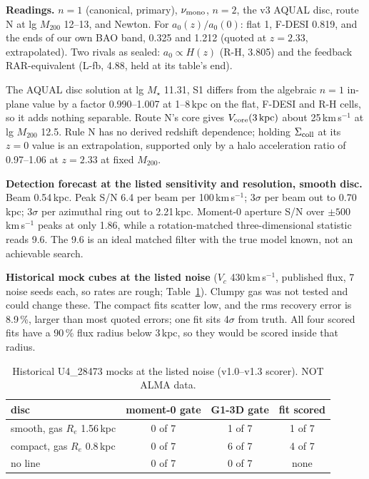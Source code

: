\documentclass[10pt]{article}
\begin{document}
\textbf{Readings.} $n=1$ (canonical, primary), $\nu_{\rm mono}$, $n=2$, the v3 AQUAL disc, route N at lg $M_{200}$ 12--13, and Newton. For $a_0(z)/a_0(0)$: flat 1, F-DESI 0.819, and the ends of our own BAO band, 0.325 and 1.212 (quoted at $z=2.33$, extrapolated). Two rivals as sealed: $a_0\propto H(z)$ (R-H, 3.805) and the feedback RAR-equivalent (L-fb, 4.88, held at its table's end).



\begin{samepage}
The AQUAL disc solution at lg $M_\star$ 11.31, S1 differs from the algebraic $n=1$ in-plane value by a factor 0.990--1.007 at 1--8\,kpc on the flat, F-DESI and R-H cells, so it adds nothing separable. Route N's core gives $V_{\rm core}(3\,{\rm kpc})$ about 25\,km\,s$^{-1}$ at lg $M_{200}$ 12.5. Rule N has no derived redshift dependence; holding $\Sigma_{\rm coll}$ at its $z=0$ value is an extrapolation, supported only by a halo acceleration ratio of 0.97--1.06 at $z=2.33$ at fixed $M_{200}$.
\par
\end{samepage}

\textbf{Detection forecast at the listed sensitivity and resolution, smooth disc.} Beam 0.54\,kpc. Peak S/N 6.4 per beam per 100\,km\,s$^{-1}$; 3$\sigma$ per beam out to 0.70\,kpc; 3$\sigma$ per azimuthal ring out to 2.21\,kpc. Moment-0 aperture S/N over $\pm500$\,km\,s$^{-1}$ peaks at only 1.86, while a rotation-matched three-dimensional statistic reads 9.6. The 9.6 is an ideal matched filter with the true model known, not an achievable search.

\textbf{Historical mock cubes at the listed noise} ($V_c$ 430\,km\,s$^{-1}$, published flux, 7 noise seeds each, so rates are rough; Table~\ref{t:mock}). Clumpy gas was not tested and could change these. The compact fits scatter low, and the rms recovery error is 8.9\,\%, larger than most quoted errors; one fit sits 4$\sigma$ from truth. All four scored fits have a 90\,\% flux radius below 3\,kpc, so they would be scored inside that radius.

\begin{table}[h]\centering\small\caption{Historical U4\_28473 mocks at the listed noise (v1.0--v1.3 scorer). NOT ALMA data.}\label{t:mock}\begin{tabular}{lccc}\toprule disc & moment-0 gate & G1-3D gate & fit scored \\ \midrule smooth, gas $R_e$ 1.56\,kpc & 0 of 7 & 1 of 7 & 1 of 7 \\ compact, gas $R_e$ 0.8\,kpc & 0 of 7 & 6 of 7 & 4 of 7 \\ no line & 0 of 7 & 0 of 7 & none \\ \bottomrule\end{tabular}\end{table}
\end{document}
